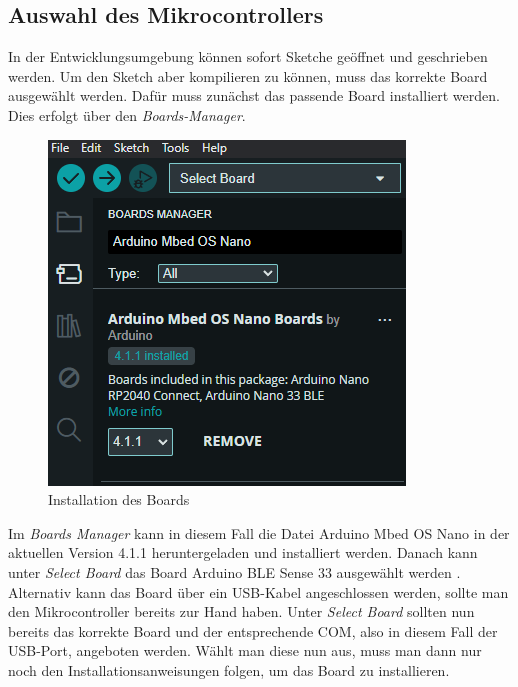 \subsection{Auswahl des Mikrocontrollers}
In der Entwicklungsumgebung können sofort Sketche geöffnet und geschrieben werden. Um den Sketch aber kompilieren zu können, muss das korrekte Board ausgewählt werden.
Dafür muss zunächst das passende Board installiert werden. 
 Dies erfolgt über den \textit{Boards-Manager}.
\begin{figure}[htb]
	\begin{center}
		\includegraphics[width=\textwidth]{General/Boardsmanager}
		\caption{Installation des Boards} \label{Installation des Boards}
	\end{center}
\end{figure}
Im \textit{Boards Manager} kann in diesem Fall die Datei Arduino Mbed OS Nano in der aktuellen Version 4.1.1 heruntergeladen und installiert werden. Danach kann unter \textit{Select Board} das Board Arduino BLE Sense 33 ausgewählt werden \cite{Arduino.2024b}.
Alternativ kann das Board über ein USB-Kabel angeschlossen werden, sollte man den Mikrocontroller bereits zur Hand haben. Unter\textit{ Select Board} sollten nun bereits das korrekte Board und der entsprechende COM, also in diesem Fall der USB-Port, angeboten werden. Wählt man diese nun aus, muss man dann nur noch den Installationsanweisungen folgen, um das Board zu installieren.

